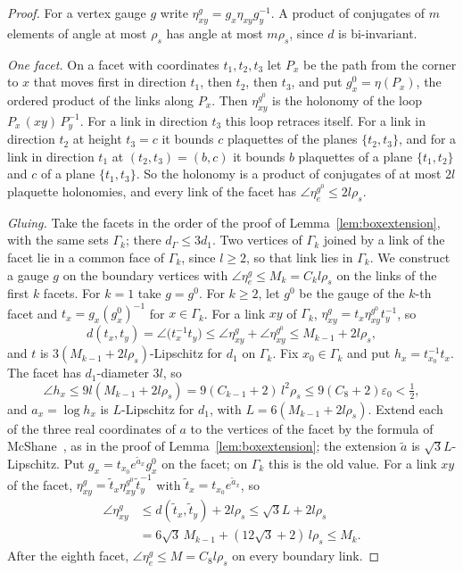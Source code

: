 \documentclass[11pt]{amsart}
\theoremstyle{definition}
\theoremstyle{remark}
\numberwithin{equation}{section}
\begin{document}
\begin{proof}
For a vertex gauge $g$ write $\eta^g_{xy}=g_x\eta_{xy}g_y^{-1}$. A product
of conjugates of $m$ elements of angle at most $\rho_s$ has angle at most
$m\rho_s$, since $d$ is bi-invariant.

\emph{One facet.} On a facet with coordinates $t_1,t_2,t_3$ let $P_x$ be
the path from the corner to $x$ that moves first in direction $t_1$, then
$t_2$, then $t_3$, and put $g^0_x=\eta(P_x)$, the ordered product of the links along
$P_x$. Then $\eta^{g^0}_{xy}$ is the holonomy of the loop $P_x\,(xy)\,
P_y^{-1}$. For a link in
direction $t_3$ this loop retraces itself. For a link in direction $t_2$ at
height $t_3=c$ it bounds $c$ plaquettes of the planes $\{t_2,t_3\}$, and
for a link in direction $t_1$ at $(t_2,t_3)=(b,c)$ it bounds $b$
plaquettes of a plane $\{t_1,t_2\}$ and $c$ of a plane $\{t_1,t_3\}$. So
the holonomy is a product of conjugates of at most $2l$ plaquette
holonomies, and every link of the facet has $\angle\eta^{g^0}_e\le
2l\rho_s$.

\emph{Gluing.} Take the facets in the order of the proof of
Lemma~\ref{lem:boxextension}, with the same sets $\Gamma_k$; there
$d_\Gamma\le3d_1$. Two vertices of $\Gamma_k$ joined by a link of the
facet lie in a common face of $\Gamma_k$, since $l\ge2$, so that link
lies in $\Gamma_k$. We construct a gauge $g$ on the boundary vertices with
$\angle\eta^g_e\le M_k=C_kl\rho_s$ on the links of the first $k$ facets.
For $k=1$ take $g=g^0$. For $k\ge2$, let $g^0$ be the gauge of the $k$-th
facet and $t_x=g_x(g^0_x)^{-1}$ for $x\in\Gamma_k$. For a link $xy$ of
$\Gamma_k$, $\eta^g_{xy}=t_x\eta^{g^0}_{xy}t_y^{-1}$, so
\[
d(t_x,t_y)=\angle\bigl(t_x^{-1}t_y\bigr)\le\angle\eta^g_{xy}+\angle
\eta^{g^0}_{xy}\le M_{k-1}+2l\rho_s ,
\]
and $t$ is $3(M_{k-1}+2l\rho_s)$-Lipschitz for $d_1$ on $\Gamma_k$. Fix
$x_0\in\Gamma_k$ and put $h_x=t_{x_0}^{-1}t_x$. The facet has $d_1$-diameter
$3l$, so
\[
\angle h_x\le9l(M_{k-1}+2l\rho_s)=9(C_{k-1}+2)\,l^2\rho_s\le9(C_8+2)
\varepsilon_0<\tfrac12 ,
\]
and $a_x=\log h_x$ is $L$-Lipschitz for $d_1$, with
$L=6(M_{k-1}+2l\rho_s)$. Extend each of the three real coordinates of $a$
to the vertices of the facet by the formula of McShane~\cite{McS34}, as in
the proof of Lemma~\ref{lem:boxextension}; the extension $\tilde a$ is
$\sqrt3L$-Lipschitz. Put $g_x=t_{x_0}e^{\tilde a_x}g^0_x$ on the facet; on
$\Gamma_k$ this is the old value. For a link $xy$ of the facet,
$\eta^g_{xy}=\tilde t_x\eta^{g^0}_{xy}\tilde t_y^{-1}$ with $\tilde t_x=
t_{x_0}e^{\tilde a_x}$, so
\[
\begin{split}
\angle\eta^g_{xy}&\le d(\tilde t_x,\tilde t_y)+2l\rho_s\le\sqrt3L+2l\rho_s\\
&=6\sqrt3\,M_{k-1}+(12\sqrt3+2)\,l\rho_s\le M_k .
\end{split}
\]
After the eighth facet, $\angle\eta^g_e\le M=C_8l\rho_s$ on every boundary
link.


\end{proof}
\end{document}
